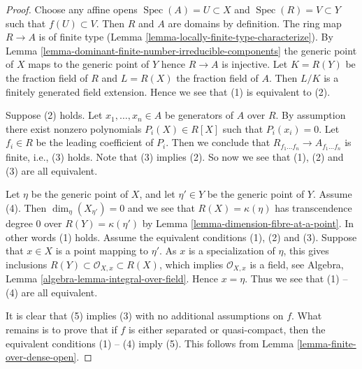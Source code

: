 \documentclass[10pt,a4paper]{amsart}
\theoremstyle{plain}
\theoremstyle{definition}
\theoremstyle{remark}
\numberwithin{equation}{subsection}
\def\Spec{\mathop{\mathrm{Spec}}}
\begin{document}
\begin{proof}
Choose any affine opens $\Spec(A) = U \subset X$
and $\Spec(R) = V \subset Y$ such that $f(U) \subset V$.
Then $R$ and $A$ are domains by definition. The ring map
$R \to A$ is of finite type
(Lemma \ref{lemma-locally-finite-type-characterize}).
By Lemma \ref{lemma-dominant-finite-number-irreducible-components}
the generic point of $X$ maps to the generic point of $Y$
hence $R \to A$ is injective. Let $K = R(Y)$ be the fraction field
of $R$ and $L = R(X)$ the fraction field of $A$. Then $L/K$
is a finitely generated field extension. Hence we see that
(1) is equivalent to (2).

\medskip\noindent
Suppose (2) holds. Let $x_1, \ldots, x_n \in A$ be generators
of $A$ over $R$. By assumption there exist nonzero polynomials
$P_i(X) \in R[X]$ such that $P_i(x_i) = 0$. Let $f_i \in R$ be the
leading coefficient of $P_i$. Then we conclude that
$R_{f_1 \ldots f_n} \to A_{f_1 \ldots f_n}$ is finite, i.e., (3) holds.
Note that (3) implies (2). So now we see that (1), (2) and (3) are all
equivalent.

\medskip\noindent
Let $\eta$ be the generic point of $X$, and let $\eta' \in Y$ be the
generic point of $Y$. Assume (4). Then
$\dim_\eta(X_{\eta'}) = 0$ and we see that $R(X) = \kappa(\eta)$ has
transcendence degree $0$ over $R(Y) = \kappa(\eta')$ by
Lemma \ref{lemma-dimension-fibre-at-a-point}.
In other words (1) holds. Assume the equivalent conditions (1), (2) and
(3). Suppose that $x \in X$ is a point mapping to $\eta'$.
As $x$ is a specialization of $\eta$,
this gives inclusions $R(Y) \subset \mathcal{O}_{X, x} \subset R(X)$,
which implies $\mathcal{O}_{X, x}$ is a field, see
Algebra, Lemma \ref{algebra-lemma-integral-over-field}.
Hence $x = \eta$. Thus we see that (1) -- (4)
are all equivalent.

\medskip\noindent
It is clear that (5) implies (3) with no additional assumptions on
$f$. What remains is to prove that if $f$ is either separated or
quasi-compact, then the equivalent conditions (1) -- (4) imply (5).
This follows from Lemma \ref{lemma-finite-over-dense-open}.
\end{proof}
\end{document}
